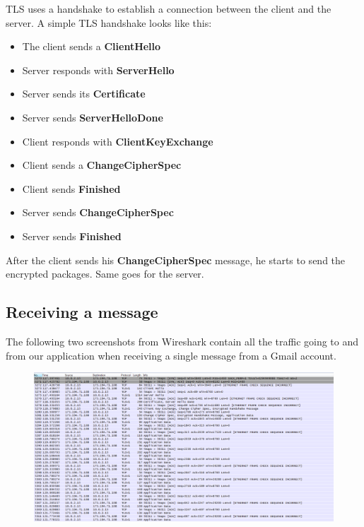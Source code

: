 \newpage

TLS uses a handshake to establish a connection between the client and the server.
A simple TLS handshake looks like this:
\begin{itemize}
\item{}The client sends a \textbf{ClientHello}
\item{}Server responds with \textbf{ServerHello}
\item{}Server sends its \textbf{Certificate}
\item{}Server sends \textbf{ServerHelloDone}
\item{}Client responds with \textbf{ClientKeyExchange}
\item{}Client sends a \textbf{ChangeCipherSpec}
\item{}Client sends \textbf{Finished}
\item{}Server sends \textbf{ChangeCipherSpec}
\item{}Server sends \textbf{Finished}
\end{itemize}

After the client sends his \textbf{ChangeCipherSpec} message, he starts to send the encrypted packages. Same goes for the server. 

\subsection{Receiving a message}

The following two screenshots from Wireshark contain all the traffic going to and from our application when receiving a single message from a Gmail account.

\begin{figure}[h!]
\begin{center}
\includegraphics{ws1}
\end{center}
\end{figure}

